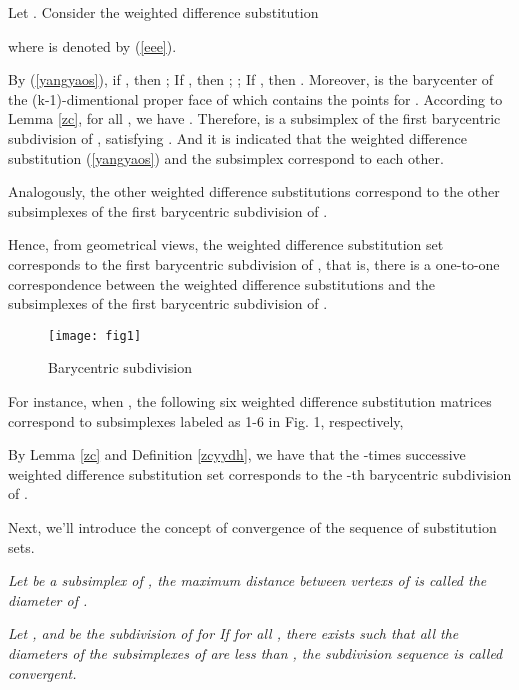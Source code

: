 \documentclass [10pt,a4paper]{article}
\begin{document}
 Let . Consider the weighted dif\mbox{}ference substitution
  
where  is denoted by (\ref{eee}).

 By (\ref{yangyaos}), if
, then ; If
, then ;
; If , then
. Moreover,  is the barycenter of the
(k-1)-dimentional proper face of  which contains the
points  for  .  According to
Lemma \ref{zc}, for all , we
have . Therefore,  is a
subsimplex of the first barycentric subdivision of ,
satisfying
.
And it is indicated that the weighted dif\mbox{}ference substitution
(\ref{yangyaos}) and  the subsimplex  correspond
to each other.

 Analogously,  the other  weighted dif\mbox{}ference substitutions correspond
 to  the other
  subsimplexes of the first barycentric subdivision of .

  Hence, from geometrical
 views, the weighted dif\mbox{}ference substitution set corresponds to
  the f\mbox{}irst barycentric subdivision of , that is,  there is a one-to-one correspondence between the weighted dif\mbox{}ference substitutions and the  subsimplexes of the first
barycentric subdivision of .
 \begin{figure}[H]
\begin{center}
\texttt{[image: fig1]}
 \caption{Barycentric subdivision}\label{Fig1}
\end{center}
\end{figure}

  For instance, when , the following six weighted dif\mbox{}ference substitution
  matrices correspond to subsimplexes labeled as 1-6 in Fig. 1,
  respectively,







By Lemma \ref{zc} and Def\mbox{}inition \ref{zcyydh}, we have that
the -times successive weighted dif\mbox{}ference  substitution
set corresponds to the -th barycentric subdivision of
.




  Next, we'll introduce the concept of
convergence of the sequence of  substitution sets.


\begin{definition}\label{sld1} \emph{ Let  be a subsimplex of ,  the maximum distance between
 vertexs of 
is called the diameter of .}
\end{definition}

\begin{definition}\label{sld0}
\emph{ Let , and  be the subdivision of
 for   If for all , there
exists  such that all the diameters of the
subsimplexes
 of  are less than , the subdivision sequence
 is called convergent.}
\end{definition}
\end{document}
